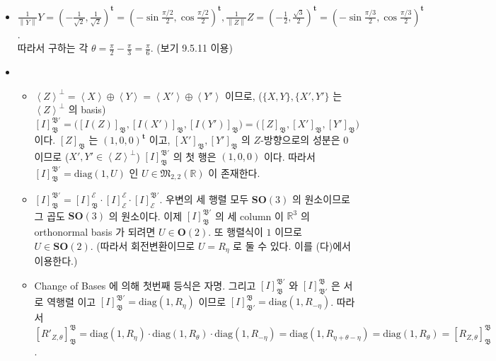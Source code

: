 \documentclass[12pt]{report}
\newcommand{\numl}[1]{\item[\large\textbf{#1}]}
\newcommand{\num}[1]{\item[\textbf{#1}]}
\newcommand{\mf}[1]{\mathfrak{#1}}
\newcommand{\mc}[1]{\mathcal{#1}}
\newcommand{\mbb}[1]{\mathbb{#1}}
\newcommand{\rmbf}[1]{\mathrm{\mathbf{#1}}}
\newcommand{\trans}{^{\mathrm{\mathbf{t}}}}
\newcommand{\norm}[1]{\left\lVert#1\right\rVert}
\newcommand{\aparen}[1]{\left\langle #1 \right\rangle}
\begin{document}
\begin{itemize}
\numl{9.5.12} $\frac{1}{\norm{Y}}Y = \left(-\frac{1}{\sqrt{2}}, \frac{1}{\sqrt{2}}\right)\trans = \left(-\sin\frac{\pi/2}{2}, \cos\frac{\pi/2}{2}\right)\trans, \frac{1}{\norm{Z}}Z = \left(-\frac{1}{2}, \frac{\sqrt{3}}{2}\right)\trans = \left(-\sin\frac{\pi/3}{2}, \cos\frac{\pi/3}{2}\right)\trans$. \\따라서 구하는 각 $\theta = \frac{\pi}{2} - \frac{\pi}{3} = \frac{\pi}{6}$. (보기 9.5.11 이용)

\numl{9.6.6}
	\begin{itemize}
		\num{(가)} $\aparen{Z}^\perp = \aparen{X}\oplus\aparen{Y} = \aparen{X'}\oplus\aparen{Y'}$ 이므로, ($\{X, Y\}, \{X', Y'\}$ 는 $\aparen{Z}^\perp$ 의 basis)$$\left[I\right]_{\mf{B}}^{\mf{B'}} = \bigg(\left[I(Z)\right]_{\mf{B}}, \left[I(X')\right]_{\mf{B}}, \left[I(Y')\right]_{\mf{B}}\bigg) = \bigg(\left[Z\right]_{\mf{B}}, \left[X'\right]_{\mf{B}}, \left[Y'\right]_{\mf{B}}\bigg)$$ 이다. $\left[Z\right]_{\mf{B}}$ 는 $(1, 0, 0)\trans$ 이고, $\left[X'\right]_{\mf{B}}, \left[Y'\right]_{\mf{B}}$ 의 $Z$-방향으로의 성분은 $0$ 이므로 ($X', Y'\in \aparen{Z}^\perp$) $\left[I\right]_{\mf{B}}^{\mf{B'}}$ 의 첫 행은 $(1, 0, 0)$ 이다. 따라서 $\left[I\right]_{\mf{B}}^{\mf{B'}} = \text{diag}(1, U)$ 인 $U\in\mf{M}_{2, 2}(\mbb{R})$ 이 존재한다.
		\num{(나)} $\left[I\right]_{\mf{B}}^{\mf{B'}} = \left[I\right]_{\mf{B}}^{\mc{E}}\cdot \left[I\right]_{\mc{E}}^{\mc{E}}\cdot \left[I\right]_{\mc{E}}^{\mf{B'}}$. 우변의 세 행렬 모두 $\rmbf{SO}(3)$ 의 원소이므로 그 곱도 $\rmbf{SO}(3)$ 의 원소이다. 이제 $\left[I\right]_{\mf{B}}^{\mf{B'}}$ 의 세 column 이 $\mbb{R}^3$ 의 orthonormal basis 가 되려면 $U \in \rmbf{O}(2)$. 또 행렬식이 $1$ 이므로 $U \in \rmbf{SO}(2)$. (따라서 회전변환이므로 $U = R_\eta$ 로 둘 수 있다. 이를 (다)에서 이용한다.)
		\num{(다)} Change of Bases 에 의해 첫번째 등식은 자명. 그리고 $\left[I\right]_{\mf{B}}^{\mf{B'}}$ 와 $\left[I\right]_{\mf{B'}}^{\mf{B}}$ 은 서로 역행렬 이고 $\left[I\right]_{\mf{B}}^{\mf{B'}} = \text{diag}(1, R_\eta)$ 이므로 $\left[I\right]_{\mf{B'}}^{\mf{B}} = \text{diag}(1, R_{-\eta})$. 따라서 $[R'_{Z, \theta}] _{\mf{B}}^{\mf{B}} = \text{diag}(1, R_{\eta}) \cdot \text{diag}(1, R_{\theta}) \cdot \text{diag}(1, R_{-\eta}) = \text{diag}(1, R_{\eta +\theta -\eta}) = \text{diag}(1, R_{\theta}) = [R_{Z, \theta}] _{\mf{B}}^{\mf{B}}$.
	\end{itemize}


\end{itemize}
\end{document}
